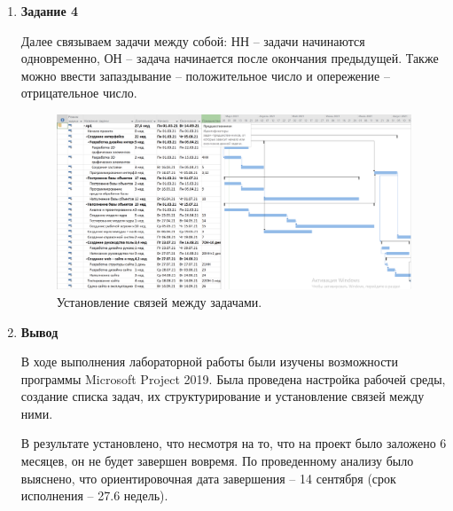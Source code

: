 \documentclass[a4paper,14pt]{extreport} %
\begin{document}
\begin{enumerate}
\item \textbf{Задание 4}

Далее связываем задачи между собой: НН -- задачи начинаются одновременно, ОН -- задача начинается после окончания предыдущей. Также можно ввести запаздывание -- положительное число и опережение -- отрицательное число.

\begin{figure}[H]
  \centering
  \caption{Установление связей между задачами. }
  \includegraphics[scale=0.39]{3}
\end{figure}

\newpage

\item \textbf{Вывод}

В ходе выполнения лабораторной работы были изучены возможности программы Microsoft Project 2019. Была проведена настройка рабочей среды, создание списка задач, их структурирование и установление связей между ними.

В результате установлено, что несмотря на то, что на проект было заложено 6 месяцев, он не будет завершен вовремя. По проведенному анализу было выяснено, что ориентировочная дата завершения – 14 сентября (срок исполнения -- 27.6 недель).

\end{enumerate}
\end{document}
